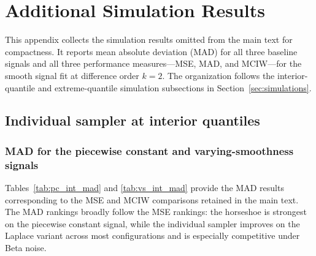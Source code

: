 \section{Additional Simulation Results}
\label{app:simulation_results}

This appendix collects the simulation results omitted from the main text for compactness. It reports mean absolute deviation (MAD) for all three baseline signals and all three performance measures---MSE, MAD, and MCIW---for the smooth signal fit at difference order $k=2$. The organization follows the interior-quantile and extreme-quantile simulation subsections in Section~\ref{sec:simulations}.

\subsection{Individual sampler at interior quantiles}
\label{app:sim:individual}

\subsubsection{MAD for the piecewise constant and varying-smoothness signals}

Tables~\ref{tab:pc_int_mad} and \ref{tab:vs_int_mad} provide the MAD results corresponding to the MSE and MCIW comparisons retained in the main text. The MAD rankings broadly follow the MSE rankings: the horseshoe is strongest on the piecewise constant signal, while the individual sampler improves on the Laplace variant across most configurations and is especially competitive under Beta noise.

